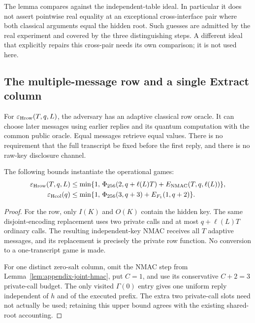 The lemma compares against the independent-table ideal. In particular it
does not assert pointwise real equality at an exceptional cross-interface
pair where both classical arguments equal the hidden root. Such guesses
are admitted by the real experiment and covered by the three
distinguishing steps. A different ideal that explicitly repairs this
cross-pair needs its own comparison; it is not used here.

\subsection{The multiple-message row and a single Extract column}

For $\varepsilon_{\rm Hrow}(T,q,L)$, the adversary has an adaptive classical
row oracle. It can choose later messages using earlier replies and its
quantum computation with the common public oracle. Equal messages retrieve
equal values. There is no requirement that the full transcript be fixed
before the first reply, and there is no raw-key disclosure channel.

\begin{lemma}
\label{lem:appendix-hmac-instances}
The following bounds instantiate the operational games:
\begin{align}
 \varepsilon_{\rm Hrow}(T,q,L)
 &\le\min\{1,\,
 \Phi_{256}(2,q+\ell(L)T)+E_{\rm NMAC}(T,q,\ell(L))\},
 \label{eq:appendix-multirow}\\
 \varepsilon_{\rm Hcol}(q)
 &\le\min\{1,\,
 \Phi_{256}(3,q+3)+E_{F_1}(1,q+2)\}.
 \label{eq:appendix-single-column}
\end{align}
\end{lemma}
\begin{proof}
For the row, only $I(K)$ and $O(K)$ contain the hidden key.
The same disjoint-encoding replacement uses two private calls and at most
$q+\ell(L)T$ ordinary calls. The resulting independent-key NMAC receives
all $T$ adaptive messages, and its replacement is precisely the private
row function. No conversion to a one-transcript game is made.

For one distinct zero-salt column, omit the NMAC step from
Lemma~\ref{lem:appendix-joint-hmac}, put $C=1$, and use its conservative
$C+2=3$ private-call budget. The only visited $\Gamma(0)$ entry gives one
uniform reply independent of $h$ and of the executed prefix. The extra
two private-call slots need not actually be used; retaining this upper
bound agrees with the existing shared-root accounting.
\end{proof}

